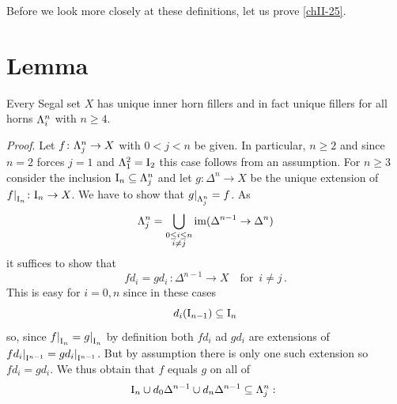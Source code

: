         Before we look more closely at these definitions, let us prove \ref{chII-25}.

    \section{Lemma}\label{chII-28}
        Every Segal set $X$ has unique inner horn fillers and in fact unique fillers for all horns $\Lambda^{n}_{i}$ with $n \geq 4$.
        \smallskip

        \emph{Proof}. Let $f \colon \Lambda^{n}_{j} \to X$ with $0 < j < n$ be given. In particular, $n \geq 2$ and since $n = 2$ forces $j = 1$ and $\Lambda^{2}_{1} = \mathrm{I}_2$ this case follows from an assumption. For $n \geq 3$ consider the inclusion $\mathrm{I}_n \subseteq \Lambda^{n}_{j}$ and let $g \colon \Delta^n \to X$ be the unique extension of ${f|}_{\mathrm{I}_n} \colon \mathrm{I}_n \to X$. We have to show that ${g|}_{\Lambda^{n}_{j}} = f$. As
        \begin{equation*}
            \Lambda^{n}_{j} = \bigcup_{\substack{0 \leq i \leq n \\ i \neq j}} \operatorname{im}(\Delta^{n-1} \to \Delta^n)
        \end{equation*}
        it suffices to show that
        \begin{equation*}
            f d_i = g d_i \,\colon \Delta^{n-1} \to X \quad \text{for} \enspace i \neq j \,.
        \end{equation*}
        This is easy for $i = 0, n$ since in these cases
        \begin{equation*}
            d_i(\mathrm{I}_{n-1}) \subseteq \mathrm{I}_n
        \end{equation*}
        so, since ${f|}_{\mathrm{I}_n} = {g|}_{\mathrm{I}_n}$ by definition both $f d_i$ ad $g d_i$ are extensions of $f{d_i|}_{\mathrm{I}^{n-1}} = g{d_i|}_{\mathrm{I}^{n-1}}$. But by assumption there is only one such extension so $fd_i = gd_i$. We thus obtain that $f$ equals $g$ on all of
        \begin{equation*}
            \mathrm{I}_n \cup d_0 \Delta^{n-1} \cup d_n \Delta^{n-1} \subseteq \Lambda^{n}_{j} \,\colon
        \end{equation*}
